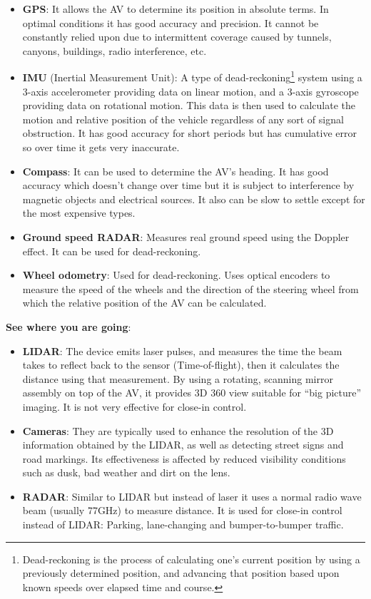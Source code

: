 \documentclass[11pt]{article}
\begin{document}
\begin{itemize}
\item \textbf{GPS}: It allows the AV to determine its position in absolute terms. In optimal conditions it has good accuracy and precision. It cannot be constantly relied upon due to intermittent coverage caused by tunnels, canyons, buildings, radio interference, etc. \cite{SchweberMouser}
\item \textbf{IMU} (Inertial Measurement Unit): A type of dead-reckoning\footnote{Dead-reckoning is the process of calculating one's current position by using a previously determined position, and advancing that position based upon known speeds over elapsed time and course.} system using a 3-axis accelerometer providing data on linear motion, and a 3-axis gyroscope providing data on rotational motion. This data is then used to calculate the motion and relative position of the vehicle regardless of any sort of signal obstruction. It has good accuracy for short periods but has cumulative error so over time it gets very inaccurate.\cite{SchweberMouser}\cite{HellstromUmea}
\item \textbf{Compass}: It can be used to determine the AV's heading. It has good accuracy which doesn't change over time but it is subject to interference by magnetic objects and electrical sources. It also can be slow to settle except for the most expensive types.\cite{HellstromUmea}\cite{BeesonTexas09}
\item \textbf{Ground speed RADAR}: Measures real ground speed using the Doppler effect. It can be used for dead-reckoning.\cite{HellstromUmea}
\item \textbf{Wheel odometry}: Used for dead-reckoning. Uses optical encoders to measure the speed of the wheels and the direction of the steering wheel from which the relative position of the AV can be calculated.\cite{HellstromUmea}\cite{BeesonTexas09}
\end{itemize}

\textbf{See where you are going}:
\begin{itemize}
\item \textbf{LIDAR}: The device emits laser pulses, and measures the time the beam takes to reflect back to the sensor (Time-of-flight), then it calculates the distance using that measurement. By using a rotating, scanning mirror assembly on top of the AV, it provides 3D 360{\textdegree} view suitable for ``big picture'' imaging. It is not very effective for close-in control.\cite{SchweberMouser}\cite{BeesonTexas09}
\item \textbf{Cameras}: They are typically used to enhance the resolution of the 3D information obtained by the LIDAR, as well as detecting street signs and road markings. Its effectiveness is affected by reduced visibility conditions such as dusk, bad weather and dirt on the lens.\cite{SchweberMouser}\cite{HellstromUmea}
\item \textbf{RADAR}: Similar to LIDAR but instead of laser it uses a normal radio wave beam (usually 77GHz) to measure distance. It is used for close-in control instead of LIDAR: Parking, lane-changing and bumper-to-bumper traffic.\cite{SchweberMouser}\cite{BeesonTexas09}\cite{HellstromUmea}
\end{itemize}
\end{document}
